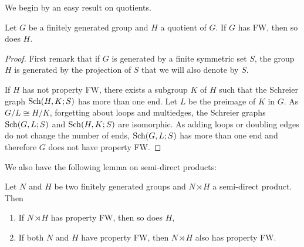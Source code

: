 We begin by an easy result on quotients.
%
%
\begin{lem}\label{Lem:Quotien}
Let $G$ be a finitely generated group and $H$ a quotient of $G$. If $G$ has FW, then so does $H$.
\end{lem}
%
\begin{proof}
First remark that if $G$ is generated by a finite symmetric set $S$, the group $H$ is generated by the projection of $S$ that we will also denote by $S$. 

If $H$ has not property FW, there exists a subgroup $K$ of $H$ such that the Schreier graph $\operatorname{Sch}(H, K;S)$ has more than one end.
Let $L$ be the preimage of $K$ in $G$. As $G/L \cong H/K$, forgetting about loops and multiedges, the Schreier graphs $\operatorname{Sch}(G,L;S)$ and $\operatorname{Sch}(H,K;S)$ are isomorphic.%
As adding loops or doubling edges do not change the number of ends, $\operatorname{Sch}(G,L;S)$ has more than one end and therefore $G$ does not have property FW.
\end{proof}
%
%
We also have the following lemma on semi-direct products:
%
%
\begin{lem}\label{Lemma:Semidirect_ends}
Let $N$ and $H$ be two finitely generated groups and $N\rtimes H$ a semi-direct product.
Then
\begin{enumerate}
\item If $N\rtimes H$ has property FW, then so does $H$,
\item If both $N$ and $H$ have property FW, then $N\rtimes H$ also has property FW.
\end{enumerate}
\end{lem}
%
%
